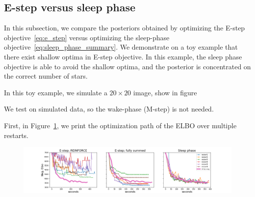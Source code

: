 \subsection{E-step versus sleep phase}
\label{sec:estep_sleep_compare}

In this subsection, we compare the posteriors obtained by optimizing the E-step objective~\eqref{eq:e_step} versus optimizing the sleep-phase objective~\eqref{eq:sleep_phase_summary}. 
We demonstrate on a toy example that there exist shallow optima in E-step objective. In this example, the sleep phase objective is able to avoid the shallow optima, and the posterior is concentrated on the correct number of stars. 

In this toy example, we simulate a $20\times20$ image, show in figure 




We test on simulated data, so the wake-phase (M-step) is not needed. 


First, in Figure~\ref{fig:optim_path}, we print the optimization path of the ELBO over multiple restarts.  

\begin{figure}[!ht]
    \centering
    \includegraphics[width = \textwidth]{figures/optim_path_compare.png}
    \caption{ }
    \label{fig:optim_path}
\end{figure}
